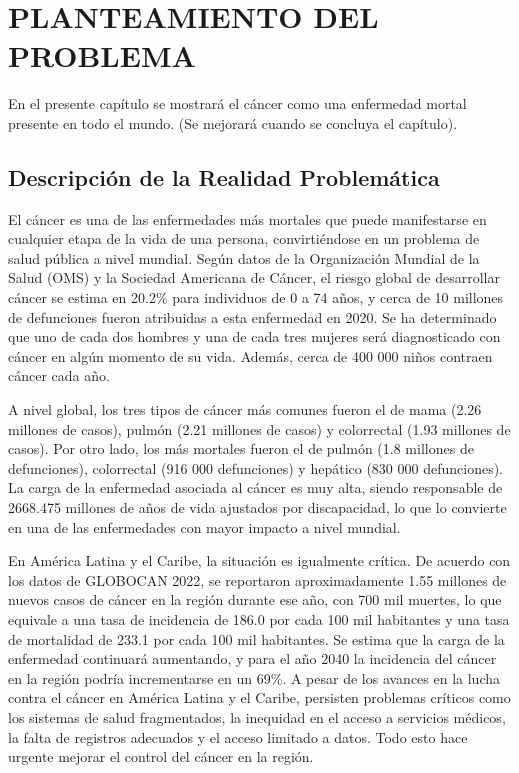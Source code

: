 \chapter{PLANTEAMIENTO DEL PROBLEMA}
En el presente capítulo se mostrará el cáncer como una enfermedad mortal presente en todo el mundo. (Se mejorará cuando se concluya el capítulo).
\section{Descripción de la Realidad Problemática}

El cáncer es una de las enfermedades más mortales que puede manifestarse en cualquier etapa de la vida de una persona, convirtiéndose en un problema de salud pública a nivel mundial. Según datos de la Organización Mundial de la Salud (OMS) y la Sociedad Americana de Cáncer, el riesgo global de desarrollar cáncer se estima en 20.2\% para individuos de 0 a 74 años, y cerca de 10 millones de defunciones fueron atribuidas a esta enfermedad en 2020. Se ha determinado que uno de cada dos hombres y una de cada tres mujeres será diagnosticado con cáncer en algún momento de su vida. Además, cerca de 400 000 niños contraen cáncer cada año.

A nivel global, los tres tipos de cáncer más comunes fueron el de mama (2.26 millones de casos), pulmón (2.21 millones de casos) y colorrectal (1.93 millones de casos). Por otro lado, los más mortales fueron el de pulmón (1.8 millones de defunciones), colorrectal (916 000 defunciones) y hepático (830 000 defunciones). La carga de la enfermedad asociada al cáncer es muy alta, siendo responsable de 2668.475 millones de años de vida ajustados por discapacidad, lo que lo convierte en una de las enfermedades con mayor impacto a nivel mundial.

En América Latina y el Caribe, la situación es igualmente crítica. De acuerdo con los datos de GLOBOCAN 2022, se reportaron aproximadamente 1.55 millones de nuevos casos de cáncer en la región durante ese año, con 700 mil muertes, lo que equivale a una tasa de incidencia de 186.0 por cada 100 mil habitantes y una tasa de mortalidad de 233.1 por cada 100 mil habitantes. Se estima que la carga de la enfermedad continuará aumentando, y para el año 2040 la incidencia del cáncer en la región podría incrementarse en un 69\%. A pesar de los avances en la lucha contra el cáncer en América Latina y el Caribe, persisten problemas críticos como los sistemas de salud fragmentados, la inequidad en el acceso a servicios médicos, la falta de registros adecuados y el acceso limitado a datos. Todo esto hace urgente mejorar el control del cáncer en la región.


